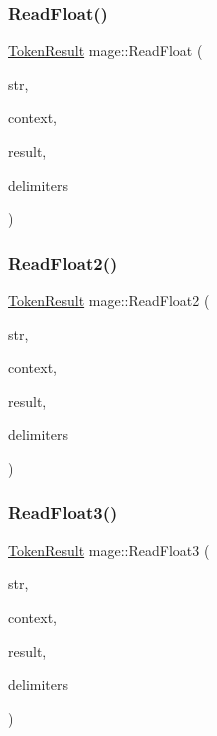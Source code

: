 \hypertarget{namespacemage_a1856d70d5bbf0c311115f875222a6f1d}{}\label{namespacemage_a1856d70d5bbf0c311115f875222a6f1d} 
\subsubsection{\texorpdfstring{Read\+Float()}{ReadFloat()}}
{\footnotesize\ttfamily \hyperlink{namespacemage_a2178ba2411db5912f41b2e7698c2037d}{Token\+Result} mage\+::\+Read\+Float (\begin{DoxyParamCaption}\item[{char $\ast$}]{str,  }\item[{char $\ast$$\ast$}]{context,  }\item[{float \&}]{result,  }\item[{const char $\ast$}]{delimiters }\end{DoxyParamCaption})}

\hypertarget{namespacemage_a544a1b747b516e80a75a260e902ccf67}{}\label{namespacemage_a544a1b747b516e80a75a260e902ccf67} 
\subsubsection{\texorpdfstring{Read\+Float2()}{ReadFloat2()}}
{\footnotesize\ttfamily \hyperlink{namespacemage_a2178ba2411db5912f41b2e7698c2037d}{Token\+Result} mage\+::\+Read\+Float2 (\begin{DoxyParamCaption}\item[{char $\ast$}]{str,  }\item[{char $\ast$$\ast$}]{context,  }\item[{X\+M\+F\+L\+O\+A\+T2 \&}]{result,  }\item[{const char $\ast$}]{delimiters }\end{DoxyParamCaption})}

\hypertarget{namespacemage_a433769b895f3199c55e44b9ff82dd67e}{}\label{namespacemage_a433769b895f3199c55e44b9ff82dd67e} 
\subsubsection{\texorpdfstring{Read\+Float3()}{ReadFloat3()}}
{\footnotesize\ttfamily \hyperlink{namespacemage_a2178ba2411db5912f41b2e7698c2037d}{Token\+Result} mage\+::\+Read\+Float3 (\begin{DoxyParamCaption}\item[{char $\ast$}]{str,  }\item[{char $\ast$$\ast$}]{context,  }\item[{X\+M\+F\+L\+O\+A\+T3 \&}]{result,  }\item[{const char $\ast$}]{delimiters }\end{DoxyParamCaption})}

